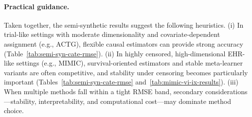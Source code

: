 \documentclass{article} %
\begin{document}
\paragraph{Practical guidance.}
Taken together, the semi-synthetic results suggest the following heuristics. (i) In trial-like settings with moderate dimensionality and covariate-dependent assignment (e.g., ACTG), flexible causal estimators can provide strong accuracy (Table~\ref{tab:semi-syn-cate-rmse}). (ii) In highly censored, high-dimensional EHR-like settings (e.g., MIMIC), survival-oriented estimators and stable meta-learner variants are often competitive, and stability under censoring becomes particularly important (Tables~\ref{tab:semi-syn-cate-rmse} and~\ref{tab:mimic-vi-ix-results}). (iii) When multiple methods fall within a tight RMSE band, secondary considerations---stability, interpretability, and computational cost---may dominate method choice.







\end{document}
